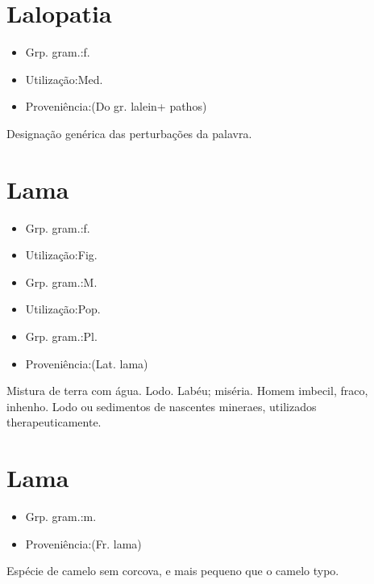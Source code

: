 \section{Lalopatia}
\begin{itemize}
\item {Grp. gram.:f.}
\end{itemize}
\begin{itemize}
\item {Utilização:Med.}
\end{itemize}
\begin{itemize}
\item {Proveniência:(Do gr. \textunderscore lalein\textunderscore  + \textunderscore pathos\textunderscore )}
\end{itemize}
Designação genérica das perturbações da palavra.
\section{Lama}
\begin{itemize}
\item {Grp. gram.:f.}
\end{itemize}
\begin{itemize}
\item {Utilização:Fig.}
\end{itemize}
\begin{itemize}
\item {Grp. gram.:M.}
\end{itemize}
\begin{itemize}
\item {Utilização:Pop.}
\end{itemize}
\begin{itemize}
\item {Grp. gram.:Pl.}
\end{itemize}
\begin{itemize}
\item {Proveniência:(Lat. \textunderscore lama\textunderscore )}
\end{itemize}
Mistura de terra com água.
Lodo.
Labéu; miséria.
Homem imbecil, fraco, inhenho.
Lodo ou sedimentos de nascentes mineraes, utilizados therapeuticamente.
\section{Lama}
\begin{itemize}
\item {Grp. gram.:m.}
\end{itemize}
\begin{itemize}
\item {Proveniência:(Fr. \textunderscore lama\textunderscore )}
\end{itemize}
Espécie de camelo sem corcova, e mais pequeno que o camelo typo.
